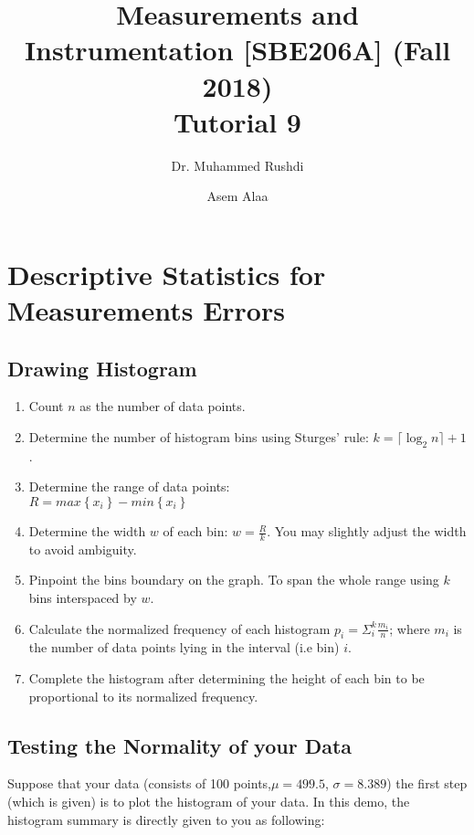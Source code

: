 \documentclass[a4paper,11pt,dvipsnames]{book}
\begin{document}
\author{Dr. Muhammed Rushdi \and Asem Alaa}

\title{Measurements and Instrumentation [SBE206A] (Fall 2018)\\ Tutorial 9}

\maketitle


\chapter*{Descriptive Statistics for Measurements Errors}


\section*{Drawing Histogram}
\begin{enumerate}
\item Count $n$ as the number of data points.
\item Determine the number of histogram bins using Sturges' rule: $k = \lceil \log_2 n \rceil+ 1$.
\item Determine the range of data points: \\$R=max\left\lbrace x_i \right\rbrace - min\left\lbrace x_i \right\rbrace$
\item Determine the width $w$ of each bin: $w = \frac{R}{k}$. You may slightly adjust the width to avoid ambiguity.
\item Pinpoint the bins boundary on the graph. To span the whole range using $k$ bins interspaced by $w$.
\item Calculate the normalized frequency of each histogram $p_i = \Sigma_i^k \frac{m_i}{n}$; where $m_i$ is the number of data points lying in the interval (i.e bin) $i$.
\item Complete the histogram after determining the height of each bin to be proportional to its normalized frequency.
\end{enumerate}

\section*{Testing the Normality of your Data}

Suppose that your data (consists of 100 points,$\mu = 499.5$, $\sigma = 8.389$) the first step (which is given) is to plot the histogram of your data. In this demo, the histogram summary is directly given to you as following: 
\end{document}
